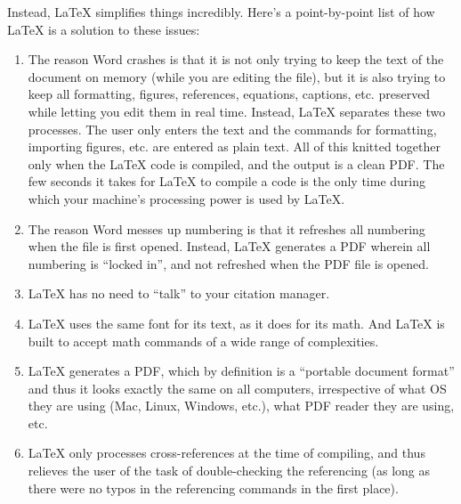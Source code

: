 Instead, \LaTeX{} simplifies things incredibly. Here's a point-by-point list of how \LaTeX{} is a solution to these issues:

\begin{enumerate}
\item The reason Word crashes is that it is not only trying to keep the text of the document on memory (while you are editing the file), but it is also trying to keep all formatting, figures, references, equations, captions, etc. preserved while letting you edit them in real time. Instead, \LaTeX{} separates these two processes. The user only enters the text and the commands for formatting, importing figures, etc. are entered as plain text. All of this knitted together only when the \LaTeX{} code is compiled, and the output is a clean PDF. The few seconds it takes for \LaTeX{} to compile a code is the only time during which your machine's processing power is used by \LaTeX{}.
\item The reason Word messes up numbering is that it refreshes all numbering when the file is first opened. Instead, \LaTeX{} generates a PDF wherein all numbering is ``locked in'', and not refreshed when the PDF file is opened.
\item \LaTeX{} has no need to ``talk'' to your citation manager.
\item \LaTeX{} uses the same font for its text, as it does for its math. And \LaTeX{} is built to accept math commands of a wide range of complexities.
\item \LaTeX{} generates a PDF, which by definition is a ``portable document format'' and thus it looks exactly the same on all computers, irrespective of what OS they are using (Mac, Linux, Windows, etc.), what PDF reader they are using, etc.
\item \LaTeX{} only processes cross-references at the time of compiling, and thus relieves the user of the task of double-checking the referencing (as long as there were no typos in the referencing commands in the first place).
\end{enumerate}
